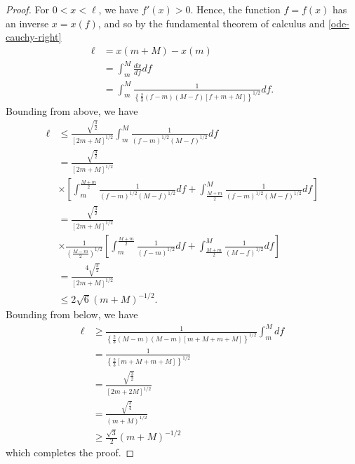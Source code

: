 \documentclass[12pt,reqno]{amsart}
\numberwithin{equation}{section}  %
\begin{document}
%
%
%
%
\begin{proof}
For $0 < x < \ell$, we have $f'(x) > 0$. Hence, the function $f = f(x)$ has an
inverse $x = x(f)$, and so by the fundamental theorem of calculus and
\eqref{ode-cauchy-right}
%
%
\begin{equation*}
\begin{split}
\ell & = x(m + M) - x(m)
\\
& = \int_{m}^{M} \frac{dx}{df} df
\\
& = \int_{m}^{M} \frac{1}{ \left\{ \frac{2}{3}(f-m)(M-f)
\left[ f 
+ m + M \right] \right\}^{1/2}} df.
\end{split}
\end{equation*}
%
%
Bounding from above, we have
%
%
\begin{equation*}
\begin{split}
\ell
& \le \frac{\sqrt{\frac{3}{2}}}{\left[ 2m + M
\right]^{1/2}} \int_{m}^{M} \frac{1}{(f-m)^{1/2}(M-f)^{1/2}}df
\\
& = \frac{\sqrt{\frac{3}{2}}}
{\left[ 2m + M
\right]^{1/2}} 
\\
& \times \left[ \int_{m}^{\frac{M+m}{2}} \frac{1}{(f-m)^{1/2}(M-f)^{1/2}}df 
+ \int_{\frac{M+m}{2}}^{M} \frac{1}{(f-m)^{1/2}(M-f)^{1/2}}df
\right]
\\
& = \frac{\sqrt{\frac{3}{2}}}
{\left[ 2m + M
\right]^{1/2}} 
\\
& \times \frac{1}{\left( \frac{M-m}{2} \right)^{1/2}} \left[ \int_{m}^{\frac{M+m}{2}} \frac{1}{(f-m)^{1/2}}df 
+ \int_{\frac{M+m}{2}}^{M} \frac{1}{(M-f)^{1/2}}df
\right]
\\
& = \frac{4 \sqrt{\frac{3}{2}}}
{\left[ 2m + M
\right]^{1/2}} 
\\
& \le 2 \sqrt{6} \left (m+M \right )^{-1/2}.
\end{split}
\end{equation*}
%
%
Bounding from below, we have
%
%
\begin{equation*}
\begin{split}
\ell
& \ge  \frac{1}{ \left\{ \frac{2}{3}(M-m)(M-m)
\left[ m + M +
m + M \right] \right\}^{1/2}} \int_{m}^{M} df
\\
& = \frac{1}{\left\{ \frac{2}{3}
\left[ m + M +
m + M \right] \right\}^{1/2}} 
\\
& = \frac{\sqrt{\frac{3}{2}}}{\left[ 2m + 2M 
 \right]^{1/2}} 
\\
& = \frac{\sqrt{\frac{3}{4}}}{\left( m + M 
\right)^{1/2}} 
\\
& \ge \frac{\sqrt{3}}{2} \left( m + M 
 \right)^{-1/2}
\end{split}
\end{equation*}
%
%
which completes the proof.
\end{proof}
\end{document}
